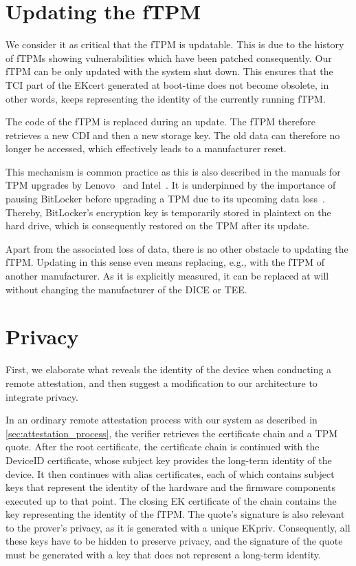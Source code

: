 \section{Updating the fTPM}

We consider it as critical that the \ac{fTPM} is updatable. This is due to the history of \acp{fTPM} showing vulnerabilities which have been patched consequently.
Our \ac{fTPM} can be only updated with the system shut down.
This ensures that the TCI part of the EKcert generated at boot-time does not become obsolete, in other words, keeps representing the identity of the currently running fTPM\@.

The code of the fTPM is replaced during an update.
The fTPM therefore retrieves a new CDI and then a new storage key.
The old data can therefore no longer be accessed, which effectively leads to a manufacturer reset.

This mechanism is common practice as this is also described in the manuals for TPM upgrades by Lenovo~\cite{LenovoTpmUpgrade} and Intel~\cite{intelTpmUpgrade}. 
It is underpinned by the importance of pausing BitLocker before upgrading a TPM due to its upcoming data loss~\cite{BitlockerTpmUpgrade}.
Thereby, BitLocker's encryption key is temporarily stored in plaintext on the hard drive, which is consequently restored on the TPM after its update.

Apart from the associated loss of data, there is no other obstacle to updating the \ac{fTPM}\@.
Updating in this sense even means replacing, e.g., with the fTPM of another manufacturer.
As it is explicitly measured, it can be replaced at will without changing the manufacturer of the \ac{DICE} or \ac{TEE}\@.

\section{Privacy}\label{sec:privacy}

First, we elaborate what reveals the identity of the device when conducting a remote attestation, and then suggest a modification to our architecture to integrate privacy.

In an ordinary remote attestation process with our system as described in \autoref{sec:attestation_process}, the verifier retrieves the certificate chain and a TPM quote.
After the root certificate, the certificate chain is continued with the DeviceID certificate, whose subject key provides the long-term identity of the device.
It then continues with alias certificates, each of which contains subject keys that represent the identity of the hardware and the firmware components executed up to that point.
The closing EK certificate of the chain contains the key representing the identity of the fTPM\@.
The quote's signature is also relevant to the prover's privacy, as it is generated with a unique EKpriv.
Consequently, all these keys have to be hidden to preserve privacy, and the signature of the quote must be generated with a key that does not represent a long-term identity.

